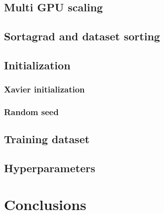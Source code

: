 \documentclass[licencjacka,en]{pracamgr}
\begin{document}
\section{Multi GPU scaling}

\section{Sortagrad and dataset sorting}

\section{Initialization}
\subsection{Xavier initialization}
\subsection{Random seed}

\section{Training dataset}

\section{Hyperparameters}





\chapter{Conclusions}\label{r:concls}
\end{document}
